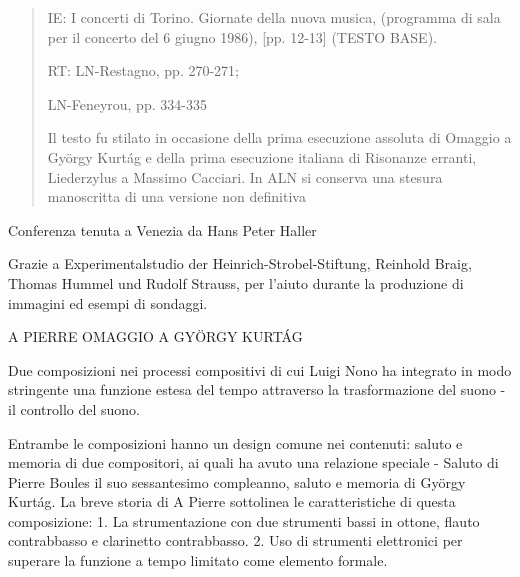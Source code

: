 \begin{quote}
{IE: I concerti di Torino. Giornate della nuova musica, (programma di sala per il concerto del 6 giugno 1986), [pp. 12-13] (TESTO BASE).

RT: LN-Restagno, pp. 270-271;

LN-Feneyrou, pp. 334-335

Il testo fu stilato in occasione della prima esecuzione assoluta di Omaggio a György Kurtág e della prima esecuzione italiana di Risonanze erranti, Liederzylus a Massimo Cacciari. In ALN si conserva una stesura manoscritta di una versione non definitiva}

\end{quote}

%

Conferenza tenuta a Venezia da Hans Peter Haller

Grazie a Experimentalstudio der Heinrich-Strobel-Stiftung, Reinhold Braig, Thomas Hummel und Rudolf Strauss, per l'aiuto durante la produzione di immagini ed esempi di sondaggi.


A PIERRE
OMAGGIO A GYÖRGY KURTÁG

Due composizioni nei processi compositivi di cui Luigi Nono ha integrato in modo stringente una funzione estesa del tempo attraverso la trasformazione del suono - il controllo del suono.

Entrambe le composizioni hanno un design comune nei contenuti: saluto e memoria di due compositori, ai quali ha avuto una relazione speciale - Saluto di Pierre Boules il suo sessantesimo compleanno, saluto e memoria di György Kurtág.
La breve storia di A Pierre sottolinea le caratteristiche di questa composizione:
1. La strumentazione con due strumenti bassi in ottone, flauto contrabbasso e clarinetto contrabbasso.
2. Uso di strumenti elettronici per superare la funzione a tempo limitato come elemento formale.

